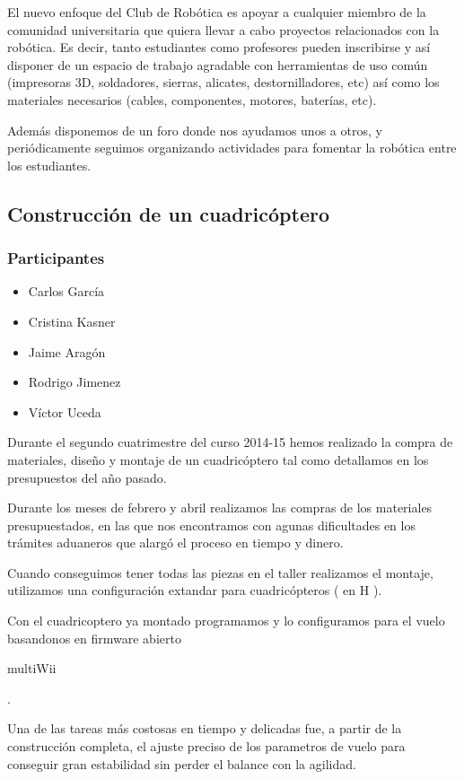 \documentclass[12pt,twoside]{report}
\begin{document}
El nuevo enfoque del Club de Robótica es apoyar a cualquier miembro de la comunidad universitaria que quiera llevar a cabo proyectos relacionados con la robótica. Es decir, tanto estudiantes como profesores pueden inscribirse y así disponer de un espacio de trabajo agradable con herramientas de uso común (impresoras 3D, soldadores, sierras, alicates, destornilladores, etc) así como los materiales necesarios (cables, componentes, motores, baterías, etc).

Además disponemos de un foro donde nos ayudamos unos a otros, y periódicamente seguimos organizando actividades para fomentar la robótica entre los estudiantes.

\subsection{Construcción de un cuadricóptero}
\subsubsection{Participantes}

\begin{itemize}


\item Carlos García
\item Cristina Kasner
\item Jaime Aragón
\item Rodrigo Jimenez
\item Víctor Uceda
\end{itemize}

Durante el segundo cuatrimestre del curso 2014-15 hemos realizado la compra de materiales, diseño y montaje de un cuadricóptero tal como detallamos en los presupuestos del año pasado.

Durante los meses de febrero y abril realizamos las compras de los materiales presupuestados, en las que nos encontramos con agunas dificultades en los trámites aduaneros que alargó el proceso en tiempo y dinero.

Cuando conseguimos tener todas las piezas en el taller realizamos el montaje, utilizamos una configuración extandar para cuadricópteros ( en H ).

Con el cuadricoptero ya montado programamos y lo configuramos para el vuelo basandonos en firmware abierto \begin{em}multiWii\end{em}.

Una de las tareas más costosas en tiempo y delicadas fue, a partir de la construcción completa, el ajuste preciso de los parametros de vuelo para conseguir gran estabilidad sin perder el balance con la agilidad.
\end{document}
